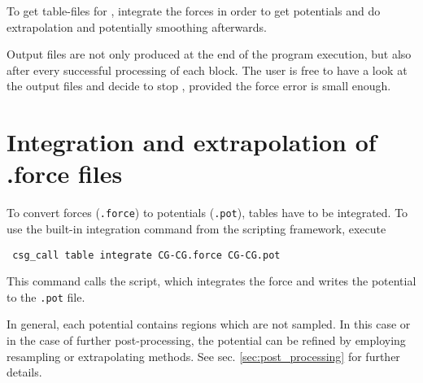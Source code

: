 To get table-files for \gromacs, integrate the forces in order to get potentials and do extrapolation and potentially smoothing afterwards.

Output files are not only produced at the end of the program execution, but also after every successful processing of each block. The user is free to have a look at the output files and decide to stop , provided the force error is small enough.

\section{Integration and extrapolation of .force files }
To convert forces (\texttt{.force}) to potentials (\texttt{.pot}), tables have to be integrated. To use the built-in integration command from the scripting framework, execute
\begin{verbatim}
 csg_call table integrate CG-CG.force CG-CG.pot
\end{verbatim}
This command calls the  script, which integrates the force and writes the potential to the \texttt{.pot} file.

In general, each potential contains regions which are not sampled. In this case or in the case of further post-processing, the potential can be refined by employing resampling or extrapolating methods. See sec. \ref{sec:post_processing} for further details.